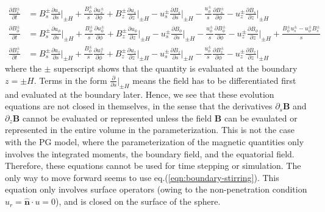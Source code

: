 \[\begin{aligned}
    \frac{\partial B_s^\pm}{\partial t} &= B_s^\pm \frac{\partial u_s}{\partial s}\bigg|_{\pm H} + \frac{B_\phi^{\pm}}{s} \frac{\partial u_s^\pm}{\partial \phi} + B_z^\pm \frac{\partial u_s}{\partial z}\bigg|_{\pm H} - u_s^\pm \frac{\partial B_s}{\partial s}\bigg|_{\pm H} - \frac{u_\phi^\pm}{s} \frac{\partial B_s^\pm}{\partial \phi} - u_z^\pm \frac{\partial B_s}{\partial z}\bigg|_{\pm H} \\ 
    \frac{\partial B_\phi^\pm}{\partial t} &= B_s^\pm \frac{\partial u_\phi}{\partial s}\bigg|_{\pm H} + \frac{B_\phi^\pm}{s} \frac{\partial u_\phi^\pm}{\partial \phi} + B_z^\pm \frac{\partial u_\phi}{\partial z}\bigg|_{\pm H} - u_s^\pm \frac{\partial B_\phi}{\partial s}\bigg|_{\pm H} - \frac{u_\phi^\pm}{s} \frac{\partial B_\phi^\pm}{\partial \phi} - u_z^\pm \frac{\partial B_\phi}{\partial z}\bigg|_{\pm H} + \frac{B_\phi^\pm u_s^\pm - u^\pm_\phi B_s^\pm}{s}\\ 
    \frac{\partial B_z^\pm}{\partial t} &= B_s^\pm \frac{\partial u_z}{\partial s}\bigg|_{\pm H} + \frac{B_\phi^\pm}{s} \frac{\partial u_z^\pm}{\partial \phi} + B_z^\pm \frac{\partial u_z}{\partial z}\bigg|_{\pm H} - u_s^\pm \frac{\partial B_z}{\partial s}\bigg|_{\pm H} - \frac{u_\phi^\pm}{s} \frac{\partial B_z^\pm}{\partial \phi} - u_z^\pm \frac{\partial B_z}{\partial z}\bigg|_{\pm H}
\end{aligned}\]
where the $\pm$ superscript shows that the quantity is evaluated at the boundary $z=\pm H$. Terms in the form $\frac{\partial}{\partial s}|_{\pm H}$ means the field has to be differentiated first and evaluated at the boundary later.
Hence, we see that these evolution equations are not closed in themselves, in the sense that the derivatives $\partial_s \mathbf{B}$ and $\partial_z \mathbf{B}$ cannot be evaluated or represented unless the field $\mathbf{B}$ can be evaulated or represented in the entire volume in the parameterization. This is not the case with the PG model, where the parameterization of the magnetic quantities only involves the integrated moments, the boundary field, and the equatorial field. Therefore, these equations cannot be used for time stepping or simulation. The only way to move forward seems to use eq.(\ref{eqn:boundary-stirring}). This equation only involves surface operators (owing to the non-penetration condition $u_r = \hat{\mathbf{n}}\cdot u = 0$), and is closed on the surface of the sphere.

